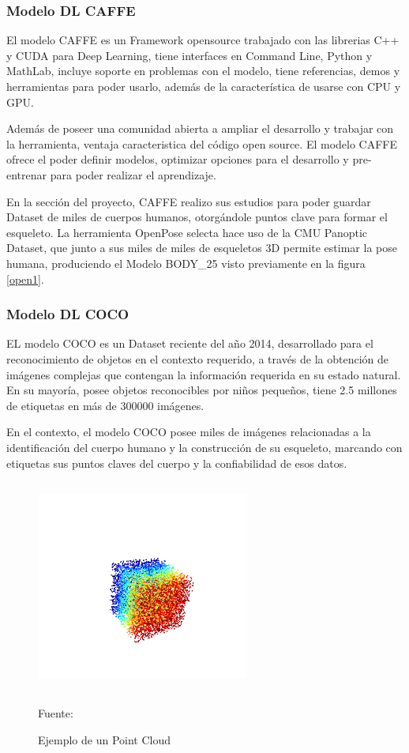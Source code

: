 \subsubsection{Modelo DL CAFFE}

El modelo CAFFE es un Framework opensource trabajado con las librerias C++ y CUDA para Deep Learning, tiene interfaces en Command Line, Python y MathLab, incluye soporte en problemas con el modelo, tiene referencias, demos y herramientas para poder usarlo, además de la característica de usarse con CPU y GPU\cite{jia2014caffe}.

Además de poseer una comunidad abierta a ampliar el desarrollo y trabajar con la herramienta, ventaja caracteristica del código open source. 
El modelo CAFFE ofrece el poder definir modelos, optimizar opciones para el desarrollo y pre-entrenar para poder realizar el aprendizaje.

En la sección del proyecto, CAFFE realizo sus estudios para poder guardar Dataset de miles de cuerpos humanos, otorgándole puntos clave para formar el esqueleto. 
La herramienta OpenPose selecta hace uso de la CMU Panoptic Dataset, que junto a sus miles de miles de esqueletos 3D permite estimar la pose humana, produciendo el Modelo BODY\_25 visto previamente en la figura \ref{open1}.

\subsubsection{Modelo DL COCO}

EL modelo COCO es un Dataset reciente del año 2014, desarrollado para el reconocimiento de objetos en el contexto requerido, a través de la obtención de imágenes complejas que contengan la información requerida en su estado natural.
En su mayoría, posee objetos reconocibles por niños pequeños, tiene 2.5 millones de etiquetas en más de 300000 imágenes.

En el contexto, el modelo COCO posee miles de imágenes relacionadas a la identificación del cuerpo humano y la construcción de su esqueleto, marcando con etiquetas sus puntos claves del cuerpo y la confiabilidad de esos datos\cite{lin2014microsoft}.

\begin{figure}[t!]
	\centering
	\includegraphics[width=7cm,height=7cm,]{./Images/pointcloudexample.jpg}
	\caption{Ejemplo de un Point Cloud}
	\footnotesize Fuente: \cite{pointcloudexample}
	\label{pointcloudexample}
\end{figure}

